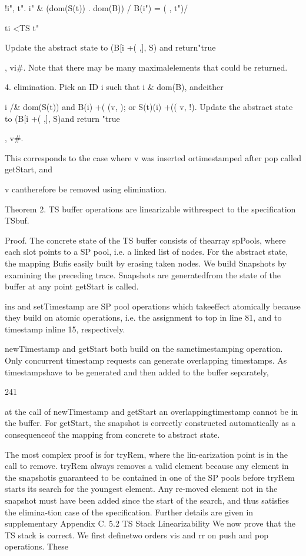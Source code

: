 !i", t". i" & (dom(S(t)) . dom(B)) / B(i") = ( , t")/

ti <TS t"

Update the abstract state to (B[i +( ,], S) and return"true

, vi#. Note that there may be many maximalelements that could be returned.

4. elimination. Pick an ID i such that i & dom(B), andeither

i /& dom(S(t)) and B(i) +( (v, ); or S(t)(i) +((
v, !). Update the abstract state to (B[i +( ,], S)and return "true

, v#.

This corresponds to the case where v was inserted ortimestamped after pop called getStart, and

v cantherefore be removed using elimination.

Theorem 2. TS buffer operations are linearizable withrespect to the specification TSbuf.

Proof. The concrete state of the TS buffer consists of thearray spPools, where each slot points to a SP pool, i.e. a
linked list of nodes. For the abstract state, the mapping Bufis easily built by erasing taken nodes. We build Snapshots
by examining the preceding trace. Snapshots are generatedfrom the state of the buffer at any point getStart is called.

ins and setTimestamp are SP pool operations which takeeffect atomically because they build on atomic operations,
i.e. the assignment to top in line 81, and to timestamp inline 15, respectively.

newTimestamp and getStart both build on the sametimestamping operation. Only concurrent timestamp requests can generate overlapping timestamps. As timestampshave to be generated and then added to the buffer separately,

241

at the call of newTimestamp and getStart an overlappingtimestamp cannot be in the buffer. For getStart, the snapshot is correctly constructed automatically as a consequenceof the mapping from concrete to abstract state.

The most complex proof is for tryRem, where the lin-earization point is in the call to remove. tryRem always removes a valid element because any element in the snapshotis guaranteed to be contained in one of the SP pools before
tryRem starts its search for the youngest element. Any re-moved element not in the snapshot must have been added
since the start of the search, and thus satisfies the elimina-tion case of the specification. Further details are given in
supplementary Appendix C.
5.2 TS Stack Linearizability
We now prove that the TS stack is correct. We first definetwo orders vis and rr on push and pop operations. These

